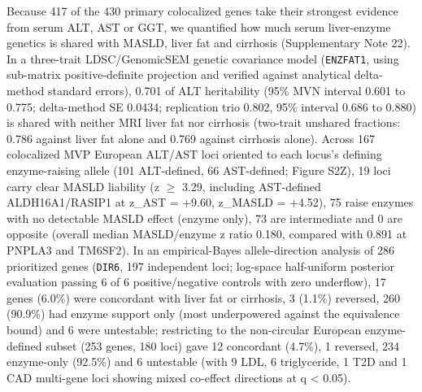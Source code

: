 Because 417 of the 430 primary colocalized genes take their strongest evidence from serum ALT, AST or GGT, we quantified how much serum liver-enzyme genetics is shared with MASLD, liver fat and cirrhosis (Supplementary Note 22). In a three-trait LDSC/GenomicSEM genetic covariance model (\texttt{ENZFAT1}, using sub-matrix positive-definite projection and verified against analytical delta-method standard errors), 0.701 of ALT heritability (95\% MVN interval 0.601 to 0.775; delta-method SE 0.0434; replication trio 0.802, 95\% interval 0.686 to 0.880) is shared with neither MRI liver fat nor cirrhosis (two-trait unshared fractions: 0.786 against liver fat alone and 0.769 against cirrhosis alone). Across 167 colocalized MVP European ALT/AST loci oriented to each locus's defining enzyme-raising allele (101 ALT-defined, 66 AST-defined; Figure S2Z), 19 loci carry clear MASLD liability (z $\ge$ 3.29, including AST-defined ALDH16A1/RASIP1 at z\_AST = +9.60, z\_MASLD = +4.52), 75 raise enzymes with no detectable MASLD effect (enzyme only), 73 are intermediate and 0 are opposite (overall median MASLD/enzyme z ratio 0.180, compared with 0.891 at PNPLA3 and TM6SF2). In an empirical-Bayes allele-direction analysis of 286 prioritized genes (\texttt{DIR6}, 197 independent loci; log-space half-uniform posterior evaluation passing 6 of 6 positive/negative controls with zero underflow), 17 genes (6.0\%) were concordant with liver fat or cirrhosis, 3 (1.1\%) reversed, 260 (90.9\%) had enzyme support only (most underpowered against the equivalence bound) and 6 were untestable; restricting to the non-circular European enzyme-defined subset (253 genes, 180 loci) gave 12 concordant (4.7\%), 1 reversed, 234 enzyme-only (92.5\%) and 6 untestable (with 9 LDL, 6 triglyceride, 1 T2D and 1 CAD multi-gene loci showing mixed co-effect directions at q \textless{} 0.05).

